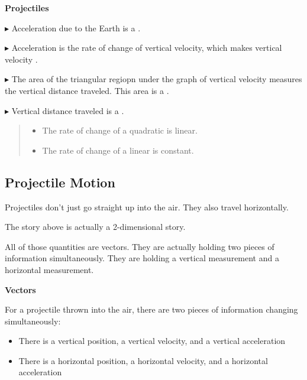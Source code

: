 \documentclass{ximera}
\begin{document}
\begin{summary} \textbf{\textcolor{red!70!yellow}{Projectiles}} 



$\blacktriangleright$ Acceleration due to the Earth is a . 

$\blacktriangleright$ Acceleration is the rate of change of vertical velocity, which makes vertical velocity . 

$\blacktriangleright$ The area of the triangular regiopn under the graph of vertical velocity measures the vertical distance traveled. This area is a . 

$\blacktriangleright$ Vertical distance traveled is a . 




\begin{quote}
\begin{itemize}
\item The rate of change of a quadratic is linear.
\item The rate of change of a linear is constant.
\end{itemize}
\end{quote}



\end{summary}








\subsection*{Projectile Motion}

Projectiles don't just go straight up into the air.  They also travel horizontally.

The story above is actually a 2-dimensional story.

All of those quantities are vectors.  They are actually holding two pieces of information simultaneously. They are holding a vertical measurement and a horizontal measurement. 

\begin{observation} \textbf{\textcolor{-red!75}{Vectors}}

For a projectile thrown into the air, there are two pieces of information changing simultaneously:

\begin{itemize}
\item There is a vertical position, a vertical velocity, and a vertical acceleration
\item There is a horizontal position, a horizontal velocity, and a horizontal acceleration
\end{itemize}
\end{observation}
\end{document}
